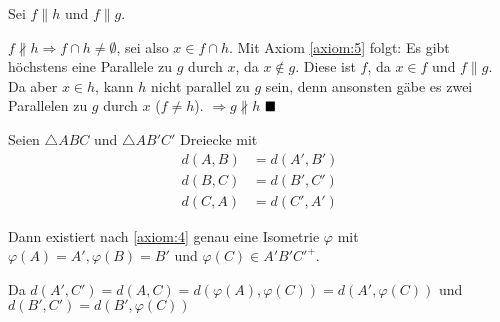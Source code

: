 \begin{solution}[\ref{ub-tut-24:a1}]
    Sei $f \parallel h$ und \obda $f \parallel g$.

    $f \nparallel h \Rightarrow f \cap h \neq \emptyset$, sei also $x \in f \cap h$.
    Mit Axiom \ref{axiom:5} folgt: Es gibt höchstens eine Parallele
    zu $g$ durch $x$, da $x \notin g$. Diese ist $f$, da $x \in f$
    und $f \parallel g$. Da aber $x \in h$, kann $h$ nicht parallel
    zu $g$ sein, denn ansonsten gäbe es zwei Parallelen zu $g$ durch
    $x$ ($f \neq h$).
    $\Rightarrow g \nparallel h$ $\qed$
\end{solution}

\begin{solution}[\ref{ub-tut-24:a3}]
    Seien $\triangle ABC$ und $\triangle AB' C'$ Dreiecke mit
    \begin{align*}
        d(A, B)  &= d(A', B')\\
        d(B, C)  &= d(B', C')\\
        d(C, A)  &= d(C', A')
    \end{align*}

    Dann existiert nach \ref{axiom:4} genau eine Isometrie $\varphi$
    mit $\varphi(A) = A', \varphi(B) = B'$ und $\varphi(C) \in A' B' C'^+$.

    Da $d(A',C') = d(A,C) = d(\varphi(A), \varphi(C)) = d(A', \varphi(C))$
    und $d(B', C') = d(B', \varphi(C))$
\end{solution}
